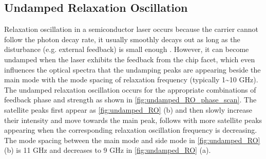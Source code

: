 
\subsection{Undamped Relaxation Oscillation}\label{subsec:undamped_RO}
Relaxation oscillation in a semiconductor laser occurs because the carrier cannot follow the photon decay rate, it usually smoothly decays out as long as the disturbance (e.g. external feedback) is small enough \cite{ohtsubo2012semiconductor}. However, it can become undamped when the laser exhibits the feedback from the chip facet, which even influences the optical spectra that the undamping peaks are appearing beside the main mode with the mode spacing of relaxation frequency (typically 1\textasciitilde{}10 GHz). The undamped relaxation oscillation occurs for the appropriate combinations of feedback phase and strength as shown in \autoref{fig:undamped_RO_phase_scan}. The satellite peaks first appear as \autoref{fig:undamped_RO} (b) and then slowly increase their intensity and move towards the main peak, follows with more satellite peaks appearing when the corresponding relaxation oscillation frequency is decreasing. The mode spacing between the main mode and side mode in \autoref{fig:undamped_RO} (b) is 11 GHz and decreases to 9 GHz in \autoref{fig:undamped_RO} (a).
